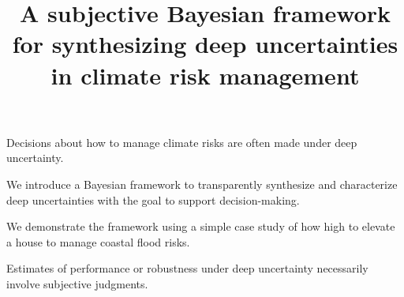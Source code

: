 \documentclass{agujournal2019}
\begin{document}
%
%


\title{A subjective Bayesian framework for synthesizing deep uncertainties in climate risk management}

%
%






\begin{keypoints}
  \item Decisions about how to manage climate risks are often made under deep uncertainty.
  \item We introduce a Bayesian framework to transparently synthesize and characterize deep uncertainties with the goal to support decision-making.
  \item We demonstrate the framework using a simple case study of how high to elevate a  house to manage coastal flood risks.
  \item Estimates of performance or robustness under deep uncertainty necessarily involve subjective judgments.
\end{keypoints}
\end{document}
